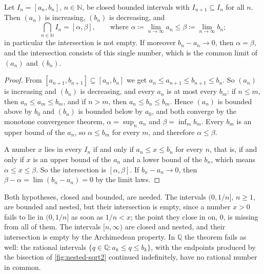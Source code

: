\begin{theorem}
\label{thm:nested}
Let $I_n=[a_n,b_n]$, $n\in\mathbb N$, be closed bounded intervals with $I_{n+1}\subseteq I_n$ for all $n$. Then $(a_n)$ is increasing, $(b_n)$ is decreasing, and
\[
\bigcap_{n\in\mathbb N}I_n=[\alpha,\beta],\qquad\text{where }\alpha\coloneqq\lim_{n\to\infty}a_n\le\beta\coloneqq\lim_{n\to\infty}b_n ;
\]
in particular the intersection is not empty. If moreover $b_n-a_n\to0$, then $\alpha=\beta$, and the intersection consists of this single number, which is the common limit of $(a_n)$ and $(b_n)$.
\end{theorem}

\begin{proof}
From $[a_{n+1},b_{n+1}]\subseteq[a_n,b_n]$ we get $a_n\le a_{n+1}\le b_{n+1}\le b_n$. So $(a_n)$ is increasing and $(b_n)$ is decreasing, and every $a_n$ is at most every $b_m$: if $n\le m$, then $a_n\le a_m\le b_m$, and if $n>m$, then $a_n\le b_n\le b_m$. Hence $(a_n)$ is bounded above by $b_0$ and $(b_n)$ is bounded below by $a_0$, and both converge by the monotone convergence theorem, $\alpha=\sup_na_n$ and $\beta=\inf_mb_m$. Every $b_m$ is an upper bound of the $a_n$, so $\alpha\le b_m$ for every $m$, and therefore $\alpha\le\beta$.

A number $x$ lies in every $I_n$ if and only if $a_n\le x\le b_n$ for every $n$, that is, if and only if $x$ is an upper bound of the $a_n$ and a lower bound of the $b_n$, which means $\alpha\le x\le\beta$. So the intersection is $[\alpha,\beta]$. If $b_n-a_n\to0$, then $\beta-\alpha=\lim(b_n-a_n)=0$ by the limit laws.
\end{proof}

Both hypotheses, closed and bounded, are needed. The intervals $(0,1/n]$, $n\ge1$, are bounded and nested, but their intersection is empty, since a number $x>0$ fails to lie in $(0,1/n]$ as soon as $1/n<x$; the point they close in on, $0$, is missing from all of them. The intervals $[n,\infty)$ are closed and nested, and their intersection is empty by the Archimedean property. In $\mathbb Q$ the theorem fails as well: the rational intervals $\{q\in\mathbb Q: a_k\le q\le b_k\}$, with the endpoints produced by the bisection of \cref{fig:nested-sqrt2} continued indefinitely, have no rational number in common.

